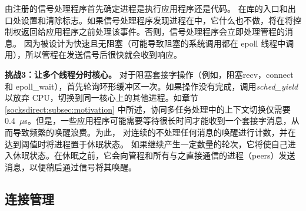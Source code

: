 由\libipc {}注册的信号处理程序首先确定进程是执行应用程序还是\libipc {}代码。 \libipc {}在库的入口和出口处设置和清除标志。如果信号处理程序发现进程在\libipc 中，它什么也不做，\libipc {}将在将控制权返回给应用程序之前处理该事件。否则，信号处理程序会立即处理管程的消息。
因为\libipc {}被设计为快速且无阻塞（可能导致阻塞的系统调用都在 epoll 线程中调用），所以管程在发送信号后很快就会收到响应。

\textbf {挑战3：让多个线程分时核心。}
对于阻塞套接字操作（例如，阻塞recv，connect 和 epoll\_wait），\libipc {}首先轮询环形缓冲区一次。如果操作没有完成，\libipc {}调用\textit {sched\_yield}以放弃 CPU，切换到同一核心上的其他进程。如章节 \ref {socksdirect:subsec:motivation} 中所述，协同多任务处理中的上下文切换仅需要0.4~$\mu$s。但是，一些应用程序可能需要等待很长时间才能收到一个套接字消息，从而导致频繁的唤醒浪费。为此，\libipc{} 对连续的不处理任何消息的唤醒进行计数，并在达到阈值时将进程置于休眠状态。
如果\libipc {}继续产生一定数量的轮次，它将使自己进入休眠状态。在休眠之前，它会向管程和所有与之直接通信的进程（peers）发送消息，以便稍后通过信号将其唤醒。





\subsection{连接管理}
\label{socksdirect:subsec:connection-management}

